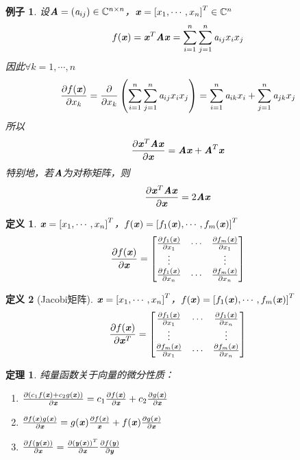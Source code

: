 \documentclass[UTF8]{ctexart}
\newtheorem{defi}{定义}
\newtheorem{thm}{定理}
\newtheorem{exam}{例子}
\begin{document}
\begin{exam}
    设$\MA = (\Sa_{ij}) \in \SetC^{n \times n}$，$\Vx = \left[ x_1, \cdots, x_n \right]^T \in \SetC^n$
    \[
        f(\Vx) = \Vx^T\MA\Vx = \sum_{i=1}^n \sum_{j=1}^n \Sa_{ij}x_ix_j
    \]
因此$\forall k = 1, \cdots, n$
    \[
        \frac{\partial f(\Vx)}{\partial x_k} = \frac{\partial}{\partial x_k} \left( \sum_{i=1}^n \sum_{j=1}^n \Sa_{ij}x_ix_j \right) = \sum_{i=1}^n \Sa_{ik}x_i + \sum_{j=1}^n \Sa_{jk}x_j
    \]
所以
    \[
        \frac{\partial \Vx^T \MA \Vx}{\partial \Vx} = \MA \Vx + \MA^T \Vx
    \]
特别地，若$\MA$为对称矩阵，则
    \[
        \frac{\partial \Vx^T \MA \Vx}{\partial \Vx} = 2 \MA \Vx
    \]
\end{exam}

\begin{defi}
    $\Vx = \left[x_1, \cdots, x_n \right]^T$，$f(\Vx) = \left[f_1(\Vx), \cdots, f_m(\Vx) \right]^T$
    \[
        \frac{\partial f(\Vx)}{\partial \Vx} = \begin{bmatrix}
\frac{\partial f_1(\Vx)}{\partial x_1}  & \cdots & \frac{\partial f_m(\Vx)}{\partial x_1} \\
            \vdots & & \vdots \\
\frac{\partial f_1(\Vx)}{\partial x_n}  & \cdots & \frac{\partial f_m(\Vx)}{\partial x_n}
        \end{bmatrix}
        \]
\end{defi}


\begin{defi}[Jacobi矩阵]
    $\Vx = \left[x_1, \cdots, x_n \right]^T$，$f(\Vx) = \left[f_1(\Vx), \cdots, f_m(\Vx) \right]^T$
    \[
        \frac{\partial f(\Vx)}{\partial \Vx^T} = \begin{bmatrix}
\frac{\partial f_1(\Vx)}{\partial x_1}  & \cdots & \frac{\partial f_1(\Vx)}{\partial x_n} \\
            \vdots & & \vdots \\
\frac{\partial f_m(\Vx)}{\partial x_1}  & \cdots & \frac{\partial f_m(\Vx)}{\partial x_n}
        \end{bmatrix}
        \]
\end{defi}

\begin{thm}
    纯量函数关于向量的微分性质：
   \begin{enumerate}
       \item $\frac{\partial(c_1f(\Vx) + c_2g(\Vx))}{\partial \Vx} = c_1 \frac{\partial f(\Vx)}{\partial \Vx} + c_2 \frac{\partial g(\Vx)}{\partial \Vx}$
       \item $\frac{\partial f(\Vx)g(\Vx)}{\partial \Vx} = g(\Vx) \frac{\partial f(\Vx)}{\Vx} + f(\Vx) \frac{\partial g(\Vx)}{\partial \Vx}$
       \item $\frac{\partial f(\Vy(\Vx))}{\partial \Vx} = \frac{\partial \left( \Vy(\Vx) \right)^T}{\partial \Vx} \frac{\partial f(\Vy)}{\partial \Vy}$
   \end{enumerate}
\end{thm}
\end{document}
